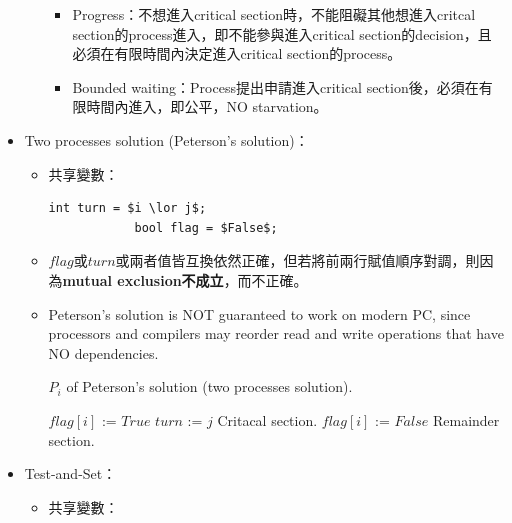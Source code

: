 \begin{itemize}
\begin{itemize}
\begin{itemize}
            \item Progress：不想進入critical section時，不能阻礙其他想進入critcal section的process進入，即不能參與進入critical section的decision，且必須在有限時間內決定進入critical section的process。
            \item Bounded waiting：Process提出申請進入critical section後，必須在有限時間內進入，即公平，NO starvation。
        \end{itemize}
    \end{itemize}
    \item Two processes solution (Peterson's solution)：\begin{itemize}
        \item 共享變數：\begin{lstlisting}[caption={Shared variables of Peterson's solution (two processes solution).}, captionpos=b, mathescape=true]
            int turn = $i \lor j$;
            bool flag = $False$;
        \end{lstlisting}
        \item $flag$或$turn$或兩者值皆互換依然正確，但若將前兩行賦值順序對調，則因為\textbf{mutual exclusion不成立}，而不正確。
        \item Peterson's solution is NOT guaranteed to work on modern PC, since processors and compilers may reorder read and write operations that have NO dependencies.
        \begin{algorithm}[H]
            \caption{$P_i$ of Peterson's solution (two processes solution).}
            \begin{algorithmic}[1]
                    \Repeat 
                        \State $flag[i]$ := $True$
                        \State $turn$ := $j$
                        \EndWhile
                        \State Critacal section.
                        \State $flag[i]$ := $False$
                        \State Remainder section.
                \EndFunction
            \end{algorithmic}
        \end{algorithm}
    \end{itemize}
    \item Test-and-Set：\begin{itemize}
        \item 共享變數：\begin{lstlisting}[caption={Shared variables of \textsc{Test-and-Set} solution.}, captionpos=b, mathescape=true]

\end{lstlisting}
\end{itemize}
\end{itemize}
